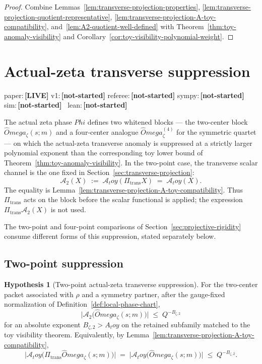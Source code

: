 \documentclass[11pt,a4paper]{amsart}
\def\Omega{Omega}%
\def\Phi{Phi}%
\def\toy{toy}%
\numberwithin{equation}{section}
\theoremstyle{plain}
\theoremstyle{definition}
\newtheorem{hypothesis}[theorem]{Hypothesis}
\newcommand{\z}{\zeta}
\newcommand{\Om}{\Omega}
\newcommand{\Ph}{\Phi}
\newcommand{\toy}{\mathrm{toy}}
\newcommand{\trans}{\mathrm{trans}}
\newcommand{\status}[1]{\textbf{\scriptsize[#1]}}
\newcommand{\statuspaper}[1]{\textsf{\footnotesize paper:}\,\status{#1}}
\newcommand{\statusmig}[1]{\textsf{\footnotesize v1:}\,\status{#1}}
\newcommand{\statusreferee}[1]{\textsf{\footnotesize referee:}\,\status{#1}}
\newcommand{\statussympy}[2][\relax]{%
  \textsf{\footnotesize sympy:}\,\status{#2}%
  \ifx\relax#1\else\,\textsf{\scriptsize\texttt{#1}}\fi%
}
\newcommand{\statussim}[2][\relax]{%
  \textsf{\footnotesize sim:}\,\status{#2}%
  \ifx\relax#1\else\,\textsf{\scriptsize\texttt{#1}}\fi%
}
\newcommand{\statuslean}[2][\relax]{%
  \textsf{\footnotesize lean:}\,\status{#2}%
  \ifx\relax#1\else\,\textsf{\scriptsize\texttt{#1}}\fi%
}
\begin{document}
\begin{proof}
Combine Lemmas~\ref{lem:transverse-projection-properties},
\ref{lem:transverse-projection-quotient-representative},
\ref{lem:transverse-projection-A-toy-compatibility},
and~\ref{lem:A2-quotient-well-defined} with
Theorem~\ref{thm:toy-anomaly-visibility} and
Corollary~\ref{cor:toy-visibility-polynomial-weight}.
\end{proof}

\section{Actual-zeta transverse suppression}
\label{sec:actual-zeta-transverse-suppression}
\statuspaper{LIVE}\quad
\statusmig{not-started}\quad
\statusreferee{not-started}\quad
\statussympy{not-started}\quad
\statussim{not-started}\quad
\statuslean{not-started}
\par\medskip

The actual zeta phase \(\Ph\) defines two whitened blocks --- the
two-center block \(\widehat\Om_\z(s;m)\) and a four-center analogue
\(\widehat\Om_\z^{(4)}\) for the symmetric quartet --- on which the
actual-zeta transverse anomaly is suppressed at a strictly larger
polynomial exponent than the corresponding toy lower bound of
Theorem~\ref{thm:toy-anomaly-visibility}.  In the two-point case, the
transverse scalar channel is the one fixed in
Section~\ref{sec:transverse-projection}:
\[
        \mathcal A_2(X)
        \;:=\;\mathcal A_\toy(\Pi_\trans X)
        \;=\;\mathcal A_\toy(X).
\]
The equality is
Lemma~\ref{lem:transverse-projection-A-toy-compatibility}.  Thus
\(\Pi_\trans\) acts on the block before the scalar functional is
applied; the expression \(\Pi_\trans\mathcal A_2(X)\) is not used.

The two-point and four-point comparisons of
Section~\ref{sec:projective-rigidity} consume different forms of this
suppression, stated separately below.

\subsection{Two-point suppression}
\label{subsec:two-point-suppression}

\begin{hypothesis}[Two-point actual-zeta transverse suppression]
\label{hyp:zeta-suppression-two-point}
For the two-center packet associated with \(\rho\) and a symmetry
partner, after the gauge-fixed normalization of
Definition~\ref{def:local-phase-chart},
\begin{equation}
\label{eq:zeta-suppression-two-point-scalar}
        \bigl|\mathcal A_2\bigl(\widehat\Om_\z(s;m)\bigr)\bigr|
        \;\le\; Q^{-B_{\z,2}}
\end{equation}
for an absolute exponent \(B_{\z,2}>A_\toy\) on the retained
subfamily matched to the toy visibility theorem.  Equivalently, by
Lemma~\ref{lem:transverse-projection-A-toy-compatibility},
\[
        \bigl|\mathcal A_\toy\bigl(\Pi_\trans\widehat\Om_\z(s;m)\bigr)\bigr|
        \;=\;
        \bigl|\mathcal A_\toy\bigl(\widehat\Om_\z(s;m)\bigr)\bigr|
        \;\le\; Q^{-B_{\z,2}}.
\]
\end{hypothesis}
\end{document}
